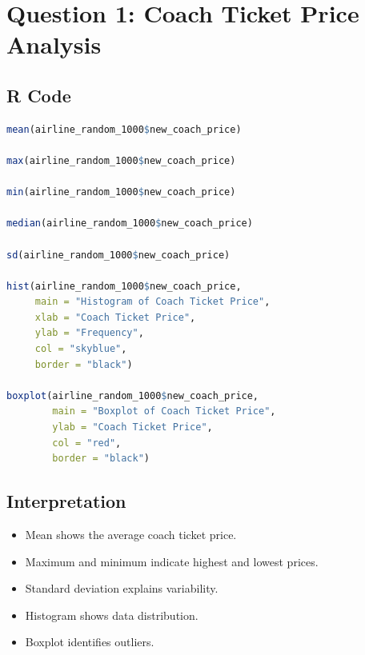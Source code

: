 \documentclass[12pt,a4paper]{article}
\begin{document}

\section{Question 1: Coach Ticket Price Analysis}

\subsection{R Code}

\begin{lstlisting}[language=R]
mean(airline_random_1000$new_coach_price)

max(airline_random_1000$new_coach_price)

min(airline_random_1000$new_coach_price)

median(airline_random_1000$new_coach_price)

sd(airline_random_1000$new_coach_price)

hist(airline_random_1000$new_coach_price, 
     main = "Histogram of Coach Ticket Price",
     xlab = "Coach Ticket Price",
     ylab = "Frequency",
     col = "skyblue",
     border = "black")

boxplot(airline_random_1000$new_coach_price,
        main = "Boxplot of Coach Ticket Price",
        ylab = "Coach Ticket Price",
        col = "red",
        border = "black")
\end{lstlisting}

\subsection{Interpretation}

\begin{itemize}
\item Mean shows the average coach ticket price.
\item Maximum and minimum indicate highest and lowest prices.
\item Standard deviation explains variability.
\item Histogram shows data distribution.
\item Boxplot identifies outliers.
\end{itemize}

\end{document}
